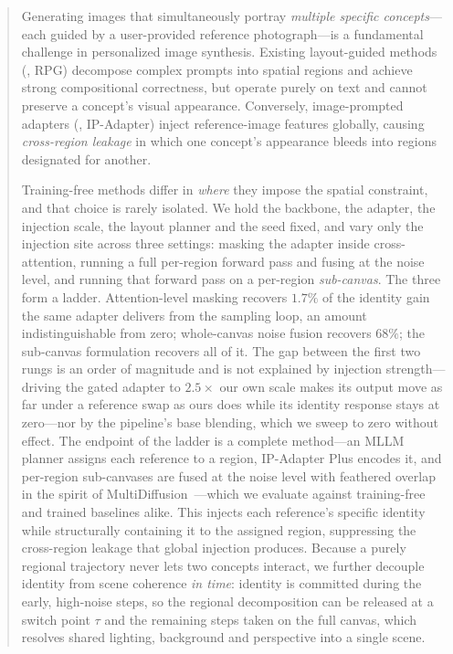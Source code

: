 \documentclass[10pt,twocolumn,letterpaper]{article}
\begin{document}
\begin{abstract}
Generating images that simultaneously portray \emph{multiple
specific concepts}—each guided by a user-provided reference
photograph—is a fundamental challenge in personalized image
synthesis.  Existing layout-guided methods (\eg, RPG) decompose
complex prompts into spatial regions and achieve strong
compositional correctness, but operate purely on text and cannot
preserve a concept's visual appearance.  Conversely, image-prompted
adapters (\eg, IP-Adapter) inject reference-image features globally,
causing \emph{cross-region leakage} in which one concept's appearance
bleeds into regions designated for another.

Training-free methods differ in \emph{where} they impose the spatial
constraint, and that choice is rarely isolated.  We hold the backbone,
the adapter, the injection scale, the layout planner and the seed fixed,
and vary only the injection site across three settings: masking the
adapter inside cross-attention, running a full per-region forward pass
and fusing at the noise level, and running that forward pass on a
per-region \emph{sub-canvas}.  The three form a ladder.  Attention-level
masking recovers $1.7\%$ of the identity gain the same adapter delivers from
the sampling loop, an amount indistinguishable from zero; whole-canvas noise
fusion recovers $68\%$; the sub-canvas formulation recovers all of it.  The gap between the first
two rungs is an order of magnitude and is not explained by injection
strength---driving the gated adapter to $2.5\times$ our own scale makes its
output move as far under a reference swap as ours does while its identity
response stays at zero---nor by the pipeline's base blending, which we sweep
to zero without effect.  The endpoint of the ladder is a complete method---an MLLM
planner assigns each reference to a region, IP-Adapter Plus encodes it,
and per-region sub-canvases are fused at the noise level with feathered
overlap in the spirit of
MultiDiffusion~\cite{bartal2023multidiffusion}---which we evaluate
against training-free and trained baselines alike.
This injects each reference's specific identity while structurally
containing it to the assigned region, suppressing the cross-region
leakage that global injection produces.
Because a purely regional trajectory never lets two concepts interact,
we further decouple identity from scene coherence \emph{in time}:
identity is committed during the early, high-noise steps, so the
regional decomposition can be released at a switch point $\tau$ and the
remaining steps taken on the full canvas, which resolves shared
lighting, background and perspective into a single scene.


\end{abstract}
\end{document}
